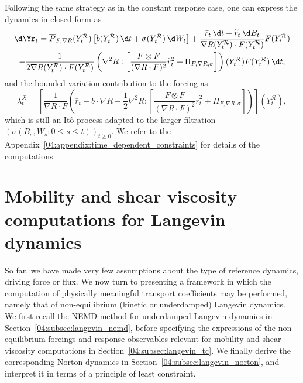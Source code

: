     Following the same strategy as in the constant response case, one can express the dynamics in closed form as 
        \begin{multline}
        \label{04:eq:norton_time_varying_constraint}
        \d \Yr_t = \overline{P}_{F,\nabla R}(Y^{\mathcal R}_t)\left[b(Y^{\mathcal R}_t)\,\d t + \sigma(Y^{\mathcal R}_t)\,\d W_t\right]
        +\frac{\bar{r}_t\,\d t+\widetilde{r}_t\,\d B_t}{\nabla R(Y^{\mathcal R}_t)\cdot F(Y^{\mathcal R}_t)}F(Y_t^{\mathcal R})\\
        -\frac{1}{2\nabla R(Y^{\mathcal R}_t)\cdot F(Y^{\mathcal R}_t)}\left(\nabla^2 R:\left[ \frac{F\otimes F}{(\nabla R\cdot F)^2}\widetilde{r}_t^2 +\Pi_{F,\nabla R,\sigma}\right]\right)(Y^{\mathcal R}_t)F(Y^{\mathcal R}_t)\,\d t,
    \end{multline}
    and the bounded-variation contribution to the forcing as
    \begin{equation*}
    \label{04:eq:norton_lambda_t_expr}
    \lambda^{\mathcal R}_t = \left[\frac1{\nabla R\cdot F}\left(\bar{r}_t-b\cdot \nabla R -\frac12 \nabla^2 R:\left[  \frac{F\otimes F}{(\nabla R\cdot F)^2} \widetilde{r}_t^2 +\Pi_{F,\nabla R,\sigma}\right]\right)\right](Y^{\mathcal R}_t),
    \end{equation*}
    which is still an Itô process adapted to the larger filtration~$\left(\sigma(B_s,W_s : 0\leq s\leq t)\right)_{t\geq 0}.$ We refer to the Appendix~\ref{04:appendix:time_dependent_constraints} for details of the computations.

\section{Mobility and shear viscosity computations for Langevin dynamics}\label{04:sec:non_eq}
So far, we have made very few assumptions about the type of reference dynamics, driving force or flux. We now turn to presenting a framework in which the computation of physically meaningful transport coefficients may be performed, namely that of non-equilibrium (kinetic or underdamped) Langevin dynamics. We first recall the NEMD method for underdamped Langevin dynamics in Section~\ref{04:subsec:langevin_nemd}, before specifying the expressions of the non-equilibrium forcings and response observables relevant for mobility and shear viscosity computations in Section~\ref{04:subsec:langevin_tc}. We finally derive the corresponding Norton dynamics in Section~\ref{04:subsec:langevin_norton}, and interpret it in terms of a principle of least constraint.

